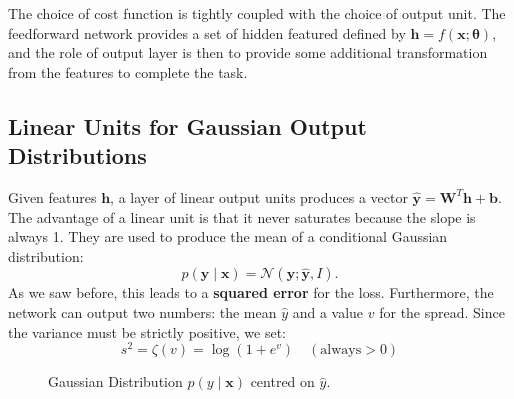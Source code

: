 The choice of cost function is tightly coupled with the choice of output unit. The feedforward network
provides a set of hidden featured defined by $\mathbf{h} = \mathit{f}(\mathbf{x};\mathbf{\theta})$, and
the role of output layer is then to provide some additional transformation from the features to complete 
the task.
\subsection{Linear Units for Gaussian Output Distributions}
Given features $\mathbf{h}$, a layer of linear output units produces a vector 
$\mathbf{\hat{y}} = \mathbf{W}^T\mathbf{h} + \mathbf{b}$. The advantage of a linear unit is that it
never saturates because the slope is always 1. 
They are used to produce the mean of a conditional Gaussian distribution: 
\begin{equation} 
    p(\boldsymbol{y} \mid \boldsymbol{x}) = \mathcal{N}(\boldsymbol{y}; \hat{\boldsymbol{y}}, I). 
\end{equation}
As we saw before, this leads to a \textbf{squared error} for the loss. 
\newline
Furthermore, the network can output two numbers: the mean $\hat{y}$ and a value $v$ for the spread. 
Since the variance must be strictly positive, we set:
\begin{equation}
    s^2 = \zeta(v) = \log(1 + e^v) \quad (\text{always} > 0)
\end{equation}

\begin{figure}[H]
    \centering
    \caption{Gaussian Distribution $p(y \mid \mathbf{x})$ centred on $\hat{y}$.}
\end{figure}

